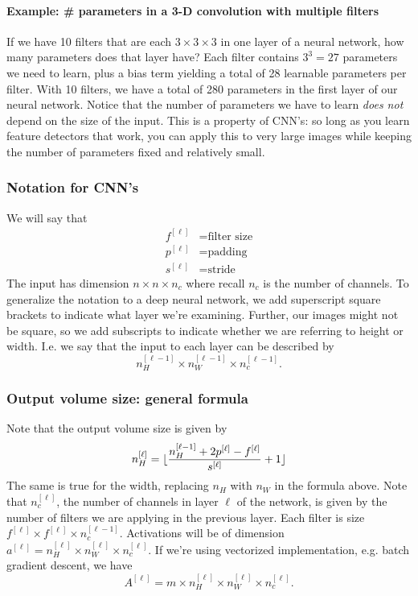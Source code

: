\documentclass[12pt]{article}
\DeclarePairedDelimiter{\floor}{\lfloor}{\rfloor}
\begin{document}
\paragraph{Example: \# parameters in a 3-D convolution with multiple filters} If we have 10 filters that are each $3 \times 3 \times 3$ in one layer of a neural network, how many
parameters does that layer have? Each filter contains $3^3 = 27$ parameters we need to learn, plus a bias term yielding a total of 
28 learnable parameters per filter. With 10 filters, we have a total of 280 parameters in the first layer of our neural network.
Notice that the number of parameters we have to learn \emph{does not} depend on the size of the input. This is a property of CNN's: so long as you learn feature detectors that work, you can apply this to very large images while keeping the number of parameters fixed and relatively small.

\subsubsection{Notation for CNN's}
We will say that
\begin{align*}   f^{[\ell]} &= \textrm{filter size} \\
  p^{[\ell]} &= \textrm{padding} \\
  s^{[\ell]} &= \textrm{stride} \end{align*}
The input has dimension $n \times n \times n_c$ where recall $n_c$ is the number of channels. To generalize the notation to a 
deep neural network, we add superscript square brackets to indicate what layer we're examining. Further, our images might not be square, so we add subscripts to indicate whether we are referring to height or width. I.e. we say that the input
to each layer can be described by
\[
n_H^{[\ell-1]} \times n_W^{[\ell-1]} \times n_c^{[\ell-1]}.
\]

\subsubsection{Output volume size: general formula}
Note that the output volume size is given by 
\[
n_H^{[\ell]} = \floor{\frac{n_H^{[\ell-1]} + 2p^{[\ell]} - f^{[\ell]}}{s^{[\ell]}} + 1}
\]
The same is true for the width, replacing $n_H$ with $n_W$ in the formula above. Note that $n_c^{[\ell]}$, the number of channels in layer $\ell$ of the network, is given by the number of filters we are applying in the previous layer.
Each filter is size $f^{[\ell]} \times f^{[\ell]} \times n_c^{[\ell-1]}$. Activations will be of dimension $a^{[\ell]} = n_H^{[\ell]} \times n_W^{[\ell]} \times n_c^{[\ell]}$. If we're using vectorized implementation, e.g. batch gradient descent, we have
\[
A^{[\ell]} = m \times n_H^{[\ell]} \times n_W^{[\ell]} \times n_c^{[\ell]}.
\]
\end{document}

